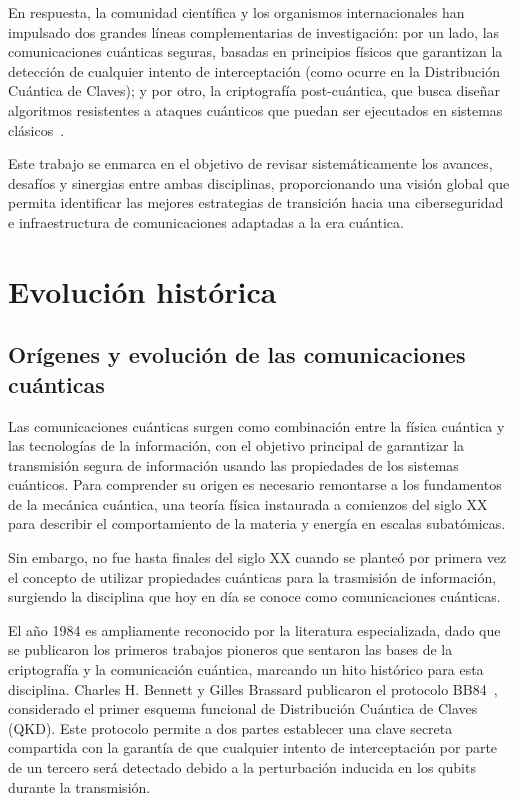 En respuesta, la comunidad científica y los organismos internacionales han impulsado dos grandes líneas complementarias de investigación: por un lado, las comunicaciones cuánticas seguras, basadas en principios físicos que garantizan la detección de cualquier intento de interceptación (como ocurre en la Distribución Cuántica de Claves); y por otro, la criptografía post-cuántica, que busca diseñar algoritmos resistentes a ataques cuánticos que puedan ser ejecutados en sistemas clásicos~\cite{Aquina2025}.

Este trabajo se enmarca en el objetivo de revisar sistemáticamente los
avances, desafíos y sinergias entre ambas disciplinas, proporcionando una
visión global que permita identificar las mejores estrategias de transición
hacia una ciberseguridad e infraestructura de comunicaciones adaptadas a la era
cuántica.


\section{Evolución histórica}

\subsection{Orígenes y evolución de las comunicaciones cuánticas}
Las comunicaciones cuánticas surgen como combinación entre la física
cuántica y las tecnologías de la información, con el objetivo principal de
garantizar la transmisión segura de información usando las propiedades de los
sistemas cuánticos. Para comprender su origen es necesario remontarse a los
fundamentos de la mecánica cuántica, una teoría física instaurada a comienzos
del siglo XX para describir el comportamiento de la materia y energía en
escalas subatómicas.

Sin embargo, no fue hasta finales del siglo XX cuando se planteó por
primera vez el concepto de utilizar propiedades cuánticas para la trasmisión de
información, surgiendo la disciplina que hoy en día se conoce como comunicaciones
cuánticas.

El año 1984 es ampliamente reconocido por la literatura especializada, dado
que se publicaron los primeros trabajos pioneros que sentaron las bases de la criptografía y la comunicación cuántica, marcando un hito histórico para esta disciplina. Charles H. Bennett y Gilles Brassard publicaron el protocolo BB84~\cite{EITCA_BB84}, considerado el primer esquema funcional de Distribución Cuántica de Claves (QKD). Este protocolo permite a dos partes establecer una clave secreta
compartida con la garantía de que cualquier intento de interceptación por parte
de un tercero será detectado debido a la perturbación inducida en los qubits
durante la transmisión.

